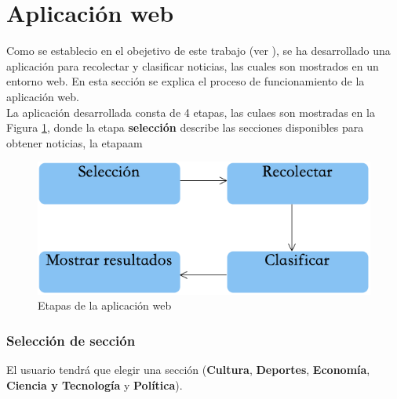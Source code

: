 \section{Aplicación web}



Como se establecio en el obejetivo de este trabajo (ver ), se ha desarrollado una aplicación para recolectar y clasificar noticias, las cuales son mostrados en un entorno web. En esta sección se explica el proceso de funcionamiento de la aplicación web.\\



La aplicación desarrollada consta de 4 etapas, las culaes son mostradas en la Figura \ref{fig:procesoAppWeb}, donde la etapa \textbf{selección} describe las secciones disponibles para obtener noticias, la etapaam

\begin{figure}[H]
	\centering
	\includegraphics[scale=0.5]{imagenes/Capitulo5/AplicacionWeb/ProcesoAplicacionWeb.png}
	\caption{Etapas de la aplicación web}
	\label{fig:procesoAppWeb}
\end{figure}

%
%
%

\subsubsection{Selección de sección}
El usuario tendrá que elegir una sección (\textbf{Cultura}, \textbf{Deportes}, \textbf{Economía}, \textbf{Ciencia y Tecnología} y \textbf{Política}). 
\\

